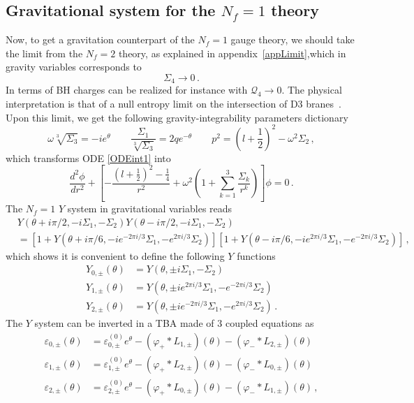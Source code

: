 \documentclass[11pt,a4paper]{elsarticle}
\def \th {\theta}
\def \ve {\varepsilon}
\def \ba {\begin{aligned}}
\def \ea {\end{aligned}}
\newcommand{\be}{\begin{equation}}
\newcommand{\ee}{\end{equation}}
\def\th{\theta}
\numberwithin{figure}{section}
\numberwithin{table}{section}
\begin{document}
\subsection{Gravitational system for the $N_f=1$ theory}



Now, to get a gravitation counterpart of the $N_f=1$ gauge theory, we should take the limit from the $N_f=2$ theory, as explained in appendix~\ref{appLimit},which in gravity variables corresponds to 
\be 
\Sigma_4 \to 0\,.
\ee 
In terms of BH charges can be realized for instance with $\mathcal{Q}_4 \to 0$. The physical interpretation is that of a null entropy limit on the intersection of D3 branes~\cite{BianchiConsoliGrilloMorales:2021b}. Upon this limit, we get the following gravity-integrability parameters dictionary
\be \label{dictGravNf1}
 \omega \sqrt[3]{\Sigma_3} = - i e^{\th }  \qquad \frac{\Sigma_1}{\sqrt[3]{\Sigma_3}}=2 q e^{-\th }  \qquad p^2  = (l+\frac{1}{2})^2 - \omega^2 \Sigma_2\,,
\ee 
which transforms ODE \eqref{ODEint1} into
\be  
\frac{d^2 \phi}{d r^2}+\left [ -\frac{(l+\frac{1}{2})^2-\frac{1}{4}}{r^2}+\omega^2\left(1+\sum_{k=1}^3 \frac{\Sigma_k}{r^k}\right)\right ]\phi = 0\,.
\ee 
The $N_f=1$ $Y$ system in gravitational variables reads
\be
\ba 
&Y(\th+i \pi/2,- i \Sigma_1,-\Sigma_2)Y(\th-i\pi/2,-i \Sigma_1,-\Sigma_2) \\
&= [1 + Y(\th+i \pi/6,-i e^{-2 \pi i/3}\Sigma_1,-e^{2\pi i/3}\Sigma_2)][1 + Y(\th-i \pi/6,-i e^{2 \pi i/3}\Sigma_1,-e^{-2\pi i/3}\Sigma_2)]\,,
\ea
\ee 
which shows it is convenient to define the following $Y$ functions
\be 
\ba
Y_{0,\pm}(\th)&= Y(\th,\pm i \Sigma_1,-\Sigma_2) \,\\ Y_{1,\pm}(\th) &= Y(\th, \pm i e^{2\pi i/3}\Sigma_1,-e^{-2\pi i/3}\Sigma_2) \, \\ Y_{2,\pm}(\th)&= Y(\th,\pm i e^{-2\pi i/3}\Sigma_1,-e^{2\pi i/3}\Sigma_2) \,.%
\ea
\ee 
\normalsize
The $Y$ system can be inverted in a TBA made of $3$ coupled equations as
\begin{align} \label{TBAG1}
\ve_{0,\pm}(\th) &= \ve_{0,\pm}^{(0)}e^\th- (\varphi_+ \ast L_{1,\pm})(\th)-(\varphi_- \ast L_{2,\pm})(\th) \\
\ve_{1,\pm}(\th) &= \ve_{1,\pm}^{(0)} e^\th- (\varphi_+ \ast L_{2,\pm})(\th)-(\varphi_- \ast L_{0,\pm})(\th) \\
\ve_{2,\pm}(\th) &= \ve_{2,\pm}^{(0)} e^\th- (\varphi_+ \ast L_{0,\pm})(\th)-(\varphi_- \ast L_{1,\pm})(\th)\,,
\end{align}
\end{document}
